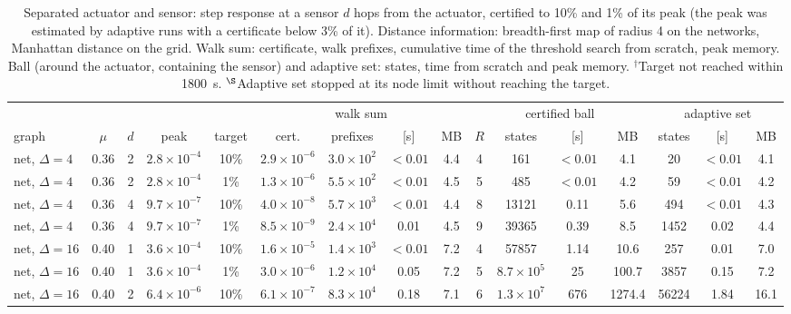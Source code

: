 \begin{table}[t]
\footnotesize\setlength{\tabcolsep}{2.6pt}
\caption{Separated actuator and sensor: step response at a sensor $d$ hops from the actuator, certified to 10\% and 1\% of its peak (the peak was estimated by adaptive runs with a certificate below 3\% of it). Distance information: breadth-first map of radius 4 on the networks, Manhattan distance on the grid. Walk sum: certificate, walk prefixes, cumulative time of the threshold search from scratch, peak memory. Ball (around the actuator, containing the sensor) and adaptive set: states, time from scratch and peak memory. $^\dagger$Target not reached within 1800~s. $^\S$Adaptive set stopped at its node limit without reaching the target.}\label{tab:noncol}
\begin{ruledtabular}
\begin{tabular}{lcccc|cccc|cccc|ccc}
 & & & & & \multicolumn{4}{c|}{walk sum} & \multicolumn{4}{c|}{certified ball} & \multicolumn{3}{c}{adaptive set}\\
graph & $\mu$ & $d$ & peak & target & cert. & prefixes & [s] & MB & $R$ & states & [s] & MB & states & [s] & MB\\\hline
net, $\Delta=4$ & 0.36 & 2 & $2.8\times10^{-4}$ & 10\% & $2.9\times10^{-6}$ & $3.0\times10^{2}$ & $<0.01$ & 4.4 & 4 & 161 & $<0.01$ & 4.1 & 20 & $<0.01$ & 4.1 \\
net, $\Delta=4$ & 0.36 & 2 & $2.8\times10^{-4}$ & 1\% & $1.3\times10^{-6}$ & $5.5\times10^{2}$ & $<0.01$ & 4.5 & 5 & 485 & $<0.01$ & 4.2 & 59 & $<0.01$ & 4.2 \\
net, $\Delta=4$ & 0.36 & 4 & $9.7\times10^{-7}$ & 10\% & $4.0\times10^{-8}$ & $5.7\times10^{3}$ & $<0.01$ & 4.4 & 8 & 13121 & 0.11 & 5.6 & 494 & $<0.01$ & 4.3 \\
net, $\Delta=4$ & 0.36 & 4 & $9.7\times10^{-7}$ & 1\% & $8.5\times10^{-9}$ & $2.4\times10^{4}$ & 0.01 & 4.5 & 9 & 39365 & 0.39 & 8.5 & 1452 & 0.02 & 4.4 \\
net, $\Delta=16$ & 0.40 & 1 & $3.6\times10^{-4}$ & 10\% & $1.6\times10^{-5}$ & $1.4\times10^{3}$ & $<0.01$ & 7.2 & 4 & 57857 & 1.14 & 10.6 & 257 & 0.01 & 7.0 \\
net, $\Delta=16$ & 0.40 & 1 & $3.6\times10^{-4}$ & 1\% & $3.0\times10^{-6}$ & $1.2\times10^{4}$ & 0.05 & 7.2 & 5 & $8.7\times10^{5}$ & 25 & 100.7 & 3857 & 0.15 & 7.2 \\
net, $\Delta=16$ & 0.40 & 2 & $6.4\times10^{-6}$ & 10\% & $6.1\times10^{-7}$ & $8.3\times10^{4}$ & 0.18 & 7.1 & 6 & $1.3\times10^{7}$ & 676 & 1274.4 & 56224 & 1.84 & 16.1 \\

\end{tabular}
\end{ruledtabular}
\end{table}
